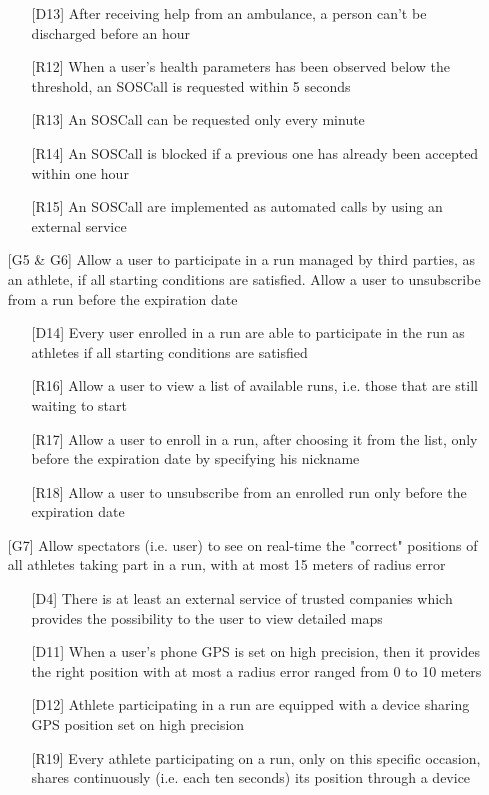 \begin{itemize}
\begin{itemize}
	\item[{[D13]}] After receiving help from an ambulance, a person can't be discharged before an hour
	\item[{[R12]}] When a user's health parameters has been observed below the threshold, an SOSCall is requested within 5 seconds
	\item[{[R13]}] An SOSCall can be requested only every minute
	\item[{[R14]}] An SOSCall is blocked if a previous one has already been accepted within one hour
	\item[{[R15]}] An SOSCall are implemented as automated calls by using an external service
	\end{itemize}
\item[{[G5 \& G6]}] Allow a user to participate in a run managed by third parties, as an athlete, if all starting conditions are satisfied. Allow a user to unsubscribe from a run before the expiration date
	\begin{itemize}
	\item[{[D14]}] Every user enrolled in a run are able to participate in the run as athletes if all starting conditions are satisfied
	\item[{[R16]}] Allow a user to view a list of available runs, i.e. those that are still waiting to start 
	\item[{[R17]}] Allow a user to enroll in a run, after choosing it from the list, only before the expiration date by specifying his nickname
	\item[{[R18]}] Allow a user to unsubscribe from an enrolled run only before the expiration date
	\end{itemize}
\item[{[G7]}] Allow spectators (i.e. user) to see on real-time the "correct" positions of all athletes taking part in a run, with at most 15 meters of radius error
	\begin{itemize}
	\item[{[D4]}] There is at least an external service of trusted companies which provides the possibility to the user to view detailed maps
	\item[{[D11]}] When a user's phone GPS is set on high precision, then it provides the right position with at most a radius error ranged from 0 to 10 meters
	\item[{[D12]}] Athlete participating in a run are equipped with a device sharing GPS position set on high precision
	\item[{[R19]}] Every athlete participating on a run, only on this specific occasion, shares continuously (i.e. each ten seconds) its position through a device

\end{itemize}
\end{itemize}
